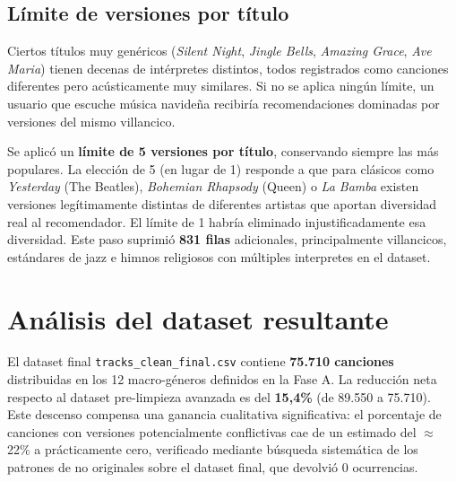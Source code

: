 \documentclass[12pt, a4paper]{book}
\theoremstyle{definition}
\begin{document}
\subsection{Límite de versiones por título}
\label{sec:cap_versiones}

Ciertos títulos muy genéricos (\textit{Silent Night}, \textit{Jingle Bells},
\textit{Amazing Grace}, \textit{Ave Maria}) tienen decenas de intérpretes
distintos, todos registrados como canciones diferentes pero acústicamente
muy similares. Si no se aplica ningún límite, un usuario que escuche música
navideña recibiría recomendaciones dominadas por versiones del mismo villancico.

Se aplicó un \textbf{límite de 5 versiones por título}, conservando siempre
las más populares. La elección de 5 (en lugar de 1) responde a que para
clásicos como \textit{Yesterday} (The Beatles), \textit{Bohemian Rhapsody}
(Queen) o \textit{La Bamba} existen versiones legítimamente distintas de
diferentes artistas que aportan diversidad real al recomendador. El límite
de 1 habría eliminado injustificadamente esa diversidad. Este paso suprimió
\textbf{831 filas} adicionales, principalmente villancicos, estándares de
jazz e himnos religiosos con múltiples interpretes en el dataset.

\section{Análisis del dataset resultante}

El dataset final \texttt{tracks\_clean\_final.csv} contiene \textbf{75.710
canciones} distribuidas en los 12 macro-géneros definidos en la Fase A.
La reducción neta respecto al dataset pre-limpieza avanzada es del
\textbf{15{,}4\%} (de 89.550 a 75.710). Este descenso compensa una ganancia
cualitativa significativa: el porcentaje de canciones con versiones
potencialmente conflictivas cae de un estimado del $\approx$22\% a
prácticamente cero, verificado mediante búsqueda sistemática de los
patrones de no originales sobre el dataset final, que devolvió 0 ocurrencias.
\end{document}
